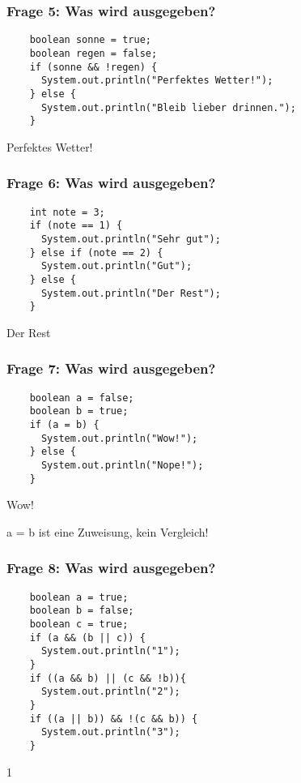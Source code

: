 \documentclass{../../presentation}
\begin{document}
\begin{frame}[fragile]
  \frametitle{Frage 5: Was wird ausgegeben?}
  \begin{verbatim}
    boolean sonne = true;
    boolean regen = false;
    if (sonne && !regen) {
      System.out.println("Perfektes Wetter!");
    } else {
      System.out.println("Bleib lieber drinnen.");
    }
  \end{verbatim}
  \pause
  \begin{ausgabe}
    Perfektes Wetter!
  \end{ausgabe}
\end{frame}

\begin{frame}[fragile]
  \frametitle{Frage 6: Was wird ausgegeben?}
  \begin{verbatim}
    int note = 3;
    if (note == 1) {
      System.out.println("Sehr gut");
    } else if (note == 2) {
      System.out.println("Gut");
    } else {
      System.out.println("Der Rest");
    }
  \end{verbatim}
  \pause
  \begin{ausgabe}
    Der Rest
  \end{ausgabe}
\end{frame}

\begin{frame}[fragile]
  \frametitle{Frage 7: Was wird ausgegeben?}
  \begin{verbatim}
    boolean a = false;
    boolean b = true;
    if (a = b) {
      System.out.println("Wow!");
    } else {
      System.out.println("Nope!");
    }
  \end{verbatim}
  \pause
  \begin{ausgabe}
    Wow!
  \end{ausgabe}
    a = b ist eine Zuweisung, kein Vergleich!\\
\end{frame}

\begin{frame}[fragile]
  \frametitle{Frage 8: Was wird ausgegeben?}
  \begin{verbatim}
    boolean a = true;
    boolean b = false;
    boolean c = true;
    if (a && (b || c)) {
      System.out.println("1");
    }
    if ((a && b) || (c && !b)){
      System.out.println("2");
    } 
    if ((a || b)) && !(c && b)) {
      System.out.println("3");
    }
  \end{verbatim}
  \pause
  \begin{ausgabe}
    1
  \end{ausgabe}
\end{frame}
\end{document}
